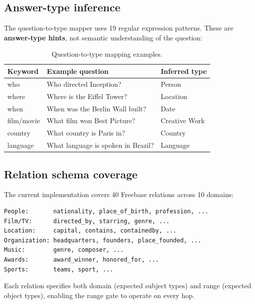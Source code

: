 \documentclass[11pt,twoside]{article}
\begin{document}
\subsection{Answer-type inference}

The question-to-type mapper uses 19 regular expression patterns. These are \textbf{answer-type hints}, not semantic understanding of the question:

\begin{table}[H]
	\centering
	\caption{Question-to-type mapping examples.}
	\label{tab:types}
	\begin{tabular}{lll}
		\toprule
		\textbf{Keyword} & \textbf{Example question}          & \textbf{Inferred type} \\
		\midrule
		who              & Who directed Inception?            & Person                 \\
		where            & Where is the Eiffel Tower?         & Location               \\
		when             & When was the Berlin Wall built?    & Date                   \\
		film/movie       & What film won Best Picture?        & Creative Work          \\
		country          & What country is Paris in?          & Country                \\
		language         & What language is spoken in Brazil? & Language               \\
		\bottomrule
	\end{tabular}
\end{table}

\subsection{Relation schema coverage}

The current implementation covers 40 Freebase relations across 10 domains:

\begin{verbatim}
People:       nationality, place_of_birth, profession, ...
Film/TV:      directed_by, starring, genre, ...
Location:     capital, contains, containedby, ...
Organization: headquarters, founders, place_founded, ...
Music:        genre, composer, ...
Awards:       award_winner, honored_for, ...
Sports:       teams, sport, ...
\end{verbatim}

Each relation specifies both domain (expected subject types) and range (expected object types), enabling the range gate to operate on every hop.
\end{document}
